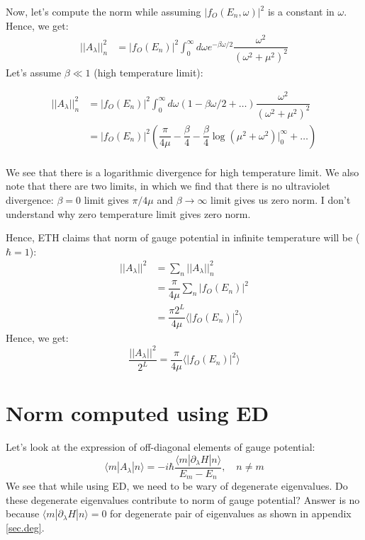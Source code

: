 \documentclass[11pt,a4paper]{article}
\begin{document}
Now, let's compute the norm while assuming $ |f_O(E_n, \omega)|^2 $ is a constant in $\omega$. Hence, we get:
\begin{align*}
||A_{\lambda}||^2_{n} &=  |f_O(E_n)|^2 \int_0^{\infty} d \omega e^{-\beta \omega/2} \dfrac{\omega^2}{(\omega^2 + \mu^2)^2} 
\end{align*}
Let's assume $\beta \ll 1$ (high temperature limit):

\begin{align*}
||A_{\lambda}||^2_{n} &=  |f_O(E_n)|^2 \int_0^{\infty} d \omega \left(1-\beta \omega/2 + \ldots \right) \dfrac{\omega^2}{(\omega^2 + \mu^2)^2}  \\
&=|f_O(E_n)|^2\left(\dfrac{\pi}{4 \mu}-\dfrac{\beta }{4}-\dfrac{\beta }{4} \log (\mu^2+ \omega^2)|_0^{\infty}  + \ldots \right) \\
\end{align*}

We see that there is a logarithmic divergence for high temperature limit. We also note that there are two limits, in which we find that there is no ultraviolet divergence: $\beta =0$ limit gives $\pi/ 4 \mu$ and $\beta \rightarrow \infty$ limit gives us zero norm. I don't understand why zero temperature limit gives zero norm.


Hence, ETH claims that norm of gauge potential in infinite temperature will be ($\hbar=1$):
\begin{align*}
||A_{\lambda}||^2 &= \sum_n ||A_{\lambda}||^2_{n} \\
&= \dfrac{\pi}{4 \mu} \sum_n |f_O(E_n)|^2\\
&= \dfrac{\pi 2^L}{4 \mu} \langle |f_O(E_n)|^2  \rangle
\end{align*}
Hence, we get:
\begin{equation}
\boxed{
\dfrac{||A_{\lambda}||^2} {2^L}= \dfrac{\pi }{4 \mu} \langle |f_O(E_n)|^2  \rangle}
\end{equation}

\section{Norm computed using ED}

Let's look at the expression of off-diagonal elements of gauge potential:
\begin{equation}
\langle m |A_{\lambda} | n \rangle =  -i \hbar \dfrac{\langle m |\partial_{\lambda}H | n \rangle}{E_m-E_n}, \quad n \neq m
\end{equation}
We see that while using ED, we need to be wary of degenerate eigenvalues. Do these degenerate eigenvalues contribute to norm of gauge potential? Answer is no because $\langle m |\partial_{\lambda}H | n \rangle=0$ for degenerate pair of eigenvalues as shown in appendix \ref{sec.deg}.
\end{document}
